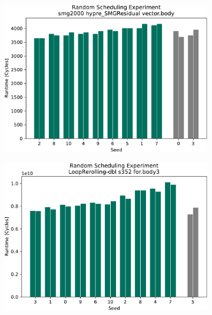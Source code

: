 \begin{figure}
\begin{subfigure}{0.45\textwidth}
        \includegraphics[width=\textwidth]{img/random-scheduling-experiment-pi-collected/smg2000-crop.pdf}
        \caption{}
        \label{fig:eval:rndm:aarch64:c}
    \end{subfigure}
    \hfill
    \begin{subfigure}{0.45\textwidth}
        \includegraphics[width=\textwidth]{img/random-scheduling-experiment-pi-collected/LoopRerolling-dbl-crop.pdf}
        \caption{}
        \label{fig:eval:rndm:aarch64:d}
    \end{subfigure}
    \begin{subfigure}{0.45\textwidth}

\end{subfigure}
\end{figure}
